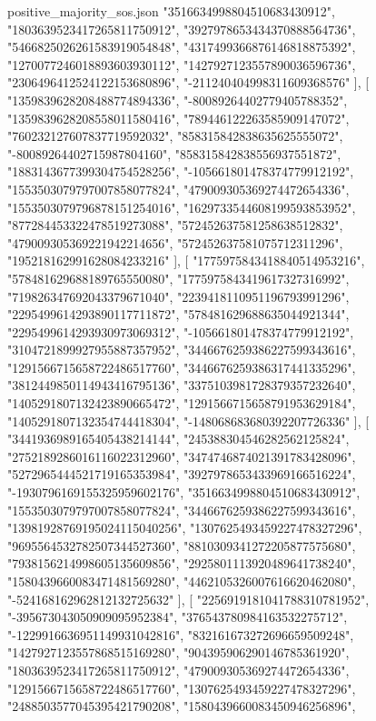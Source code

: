 \begin{filecontents*}[overwrite]{positive_majority_sos.json}
    "3516634998804510683430912",
    "1803639523417265811750912",
    "3927978653434370888564736",
    "5466825026261583919054848",
    "4317499366876146818875392",
    "1270077246018893603930112",
    "1427927123557890036596736",
    "2306496412524122153680896",
    "-211240404998311609368576"
   ],
   [
    "1359839628208488774894336",
    "-80089264402779405788352",
    "1359839628208558011580416",
    "789446122263585909147072",
    "760232127607837719592032",
    "858315842838635625555072",
    "-80089264402715987804160",
    "858315842838556937551872",
    "1883143677399304754528256",
    "-105661801478374779912192",
    "1553503079797007858077824",
    "479009305369274472654336",
    "1553503079796878151254016",
    "1629733544608199593853952",
    "877284453322478519273088",
    "572452637581258638512832",
    "479009305369221942214656",
    "572452637581075712311296",
    "195218162991628084233216"
   ],
   [
    "1775975843418840514953216",
    "578481629688189765550080",
    "1775975843419617327316992",
    "719826347692043379671040",
    "2239418110951196793991296",
    "2295499614293890117711872",
    "578481629688635044921344",
    "2295499614293930973069312",
    "-105661801478374779912192",
    "3104721899927955887357952",
    "3446676259386227599343616",
    "1291566715658722486517760",
    "3446676259386317441335296",
    "3812449850114943416795136",
    "3375103981728379357232640",
    "1405291807132423890665472",
    "1291566715658791953629184",
    "1405291807132354744418304",
    "-148068683680392207726336"
   ],
   [
    "3441936989165405438214144",
    "245388304546282562125824",
    "2752189286016116022312960",
    "3474746874021391783428096",
    "5272965444521719165353984",
    "3927978653433969166516224",
    "-1930796169155325959602176",
    "3516634998804510683430912",
    "1553503079797007858077824",
    "3446676259386227599343616",
    "13981928769195024115040256",
    "1307625493459227478327296",
    "9695564532782507344527360",
    "8810309341272205877575680",
    "7938156214998605135609856",
    "2925801113920489641738240",
    "1580439660083471481569280",
    "4462105326007616620462080",
    "-524168162962812132725632"
   ],
   [
    "2256919181041788310781952",
    "-395673043050909095952384",
    "376543780984163532275712",
    "-1229916636951149931042816",
    "832161673272696659509248",
    "1427927123557868515169280",
    "904395906290146785361920",
    "1803639523417265811750912",
    "479009305369274472654336",
    "1291566715658722486517760",
    "1307625493459227478327296",
    "2488503577045395421790208",
    "1580439660083450946256896",

\end{filecontents*}
